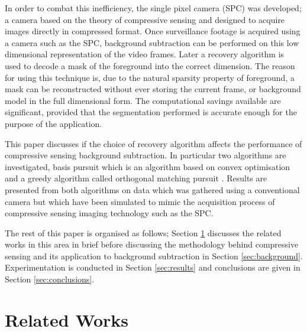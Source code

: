 In order to combat this inefficiency, the single pixel camera (SPC) \citep{Duarte2008Single} was developed; a camera based on the theory of compressive sensing \citep{Candes2006, Candes2006a, Donoho2006} and designed to acquire images directly in compressed format. Once surveillance footage is acquired using a camera such as the SPC, background subtraction can be performed on this low dimensional representation of the video frames. Later a recovery algorithm is used to decode a mask of the foreground into the correct dimension. The reason for using this technique is, due to the natural sparsity property of foreground, a mask can be reconstructed without ever storing the current frame, or background model in the full dimensional form. The computational savings available are significant, provided that the segmentation performed is accurate enough for the purpose of the application. 

This paper discusses if the choice of recovery algorithm affects the performance of compressive sensing background subtraction. In particular two algorithms are investigated, basis pursuit \citep{Candes2005} which is an algorithm based on convex optimisation \citep{boyd2004convex} and a greedy algorithm called orthogonal matching pursuit \citep{Tropp2004}. Results are presented from both algorithms on data which was gathered using a conventional camera but which have been simulated to mimic the acquisition process of compressive sensing imaging technology such as the SPC. 

The rest of this paper is organised as follows; Section \ref{sec:related-works} discusses the related works in this area in brief before discussing the methodology behind compressive sensing and its application to background subtraction in Section \ref{sec:background}. Experimentation is conducted in Section \ref{sec:results} and conclusions are given in Section \ref{sec:conclusions}. 


\section{Related Works}
\label{sec:related-works}

